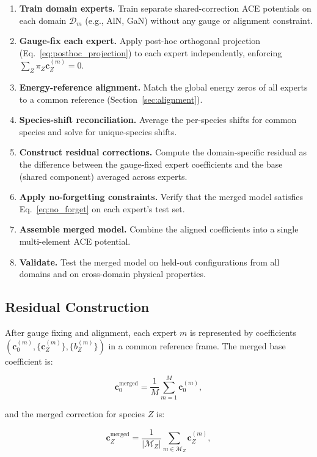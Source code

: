 \documentclass[twoside,prb,aps,floatfix,superscriptaddress,longbibliography]{revtex4-2}
\newcommand{\cZ}{\mathbf{c}_{Z}}
\newcommand{\cb}{\mathbf{c}_{0}}
\begin{document}
\begin{enumerate}[label=\textbf{Step \arabic*:}]
    \item \textbf{Train domain experts.} Train separate shared-correction ACE potentials on each domain $\mathcal{D}_m$ (e.g., AlN, GaN) without any gauge or alignment constraint.
    \item \textbf{Gauge-fix each expert.} Apply post-hoc orthogonal projection (Eq.~\eqref{eq:posthoc_projection}) to each expert independently, enforcing $\sum_Z \pi_Z \cZ^{(m)} = 0$.
    \item \textbf{Energy-reference alignment.} Match the global energy zeros of all experts to a common reference (Section~\ref{sec:alignment}).
    \item \textbf{Species-shift reconciliation.} Average the per-species shifts for common species and solve for unique-species shifts.
    \item \textbf{Construct residual corrections.} Compute the domain-specific residual as the difference between the gauge-fixed expert coefficients and the base (shared component) averaged across experts.
    \item \textbf{Apply no-forgetting constraints.} Verify that the merged model satisfies Eq.~\eqref{eq:no_forget} on each expert's test set.
    \item \textbf{Assemble merged model.} Combine the aligned coefficients into a single multi-element ACE potential.
    \item \textbf{Validate.} Test the merged model on held-out configurations from all domains and on cross-domain physical properties.
\end{enumerate}

\subsection{Residual Construction}

After gauge fixing and alignment, each expert $m$ is represented by coefficients $(\cb^{(m)}, \{\cZ^{(m)}\}, \{b_Z^{(m)}\})$ in a common reference frame. The merged base coefficient is:

\begin{equation}
\cb^{\mathrm{merged}} = \frac{1}{M} \sum_{m=1}^{M} \cb^{(m)},
\label{eq:base_average}
\end{equation}

and the merged correction for species $Z$ is:

\begin{equation}
\cZ^{\mathrm{merged}} = \frac{1}{|\mathcal{M}_Z|} \sum_{m \in \mathcal{M}_Z} \cZ^{(m)},
\label{eq:correction_average}
\end{equation}
\end{document}
